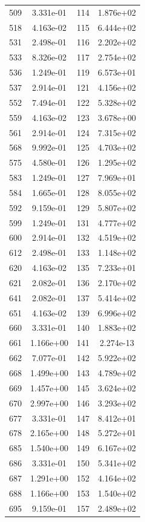 \documentclass[12pt]{article}
\begin{document}
\begin{longtable}{@{}cccc@{}}
509 & 3.331e-01 & 114 & 1.876e+02 \\
518 & 4.163e-02 & 115 & 6.444e+02 \\
531 & 2.498e-01 & 116 & 2.202e+02 \\
533 & 8.326e-02 & 117 & 2.754e+02 \\
536 & 1.249e-01 & 119 & 6.573e+01 \\
537 & 2.914e-01 & 121 & 4.156e+02 \\
552 & 7.494e-01 & 122 & 5.328e+02 \\
559 & 4.163e-02 & 123 & 3.678e+00 \\
561 & 2.914e-01 & 124 & 7.315e+02 \\
568 & 9.992e-01 & 125 & 4.703e+02 \\
575 & 4.580e-01 & 126 & 1.295e+02 \\
583 & 1.249e-01 & 127 & 7.969e+01 \\
584 & 1.665e-01 & 128 & 8.055e+02 \\
592 & 9.159e-01 & 129 & 5.807e+02 \\
599 & 1.249e-01 & 131 & 4.777e+02 \\
600 & 2.914e-01 & 132 & 4.519e+02 \\
612 & 2.498e-01 & 133 & 1.148e+02 \\
620 & 4.163e-02 & 135 & 7.233e+01 \\
621 & 2.082e-01 & 136 & 2.170e+02 \\
641 & 2.082e-01 & 137 & 5.414e+02 \\
651 & 4.163e-02 & 139 & 6.996e+02 \\
660 & 3.331e-01 & 140 & 1.883e+02 \\
661 & 1.166e+00 & 141 & 2.274e-13 \\
662 & 7.077e-01 & 142 & 5.922e+02 \\
668 & 1.499e+00 & 143 & 4.789e+02 \\
669 & 1.457e+00 & 145 & 3.624e+02 \\
670 & 2.997e+00 & 146 & 3.293e+02 \\
677 & 3.331e-01 & 147 & 8.412e+01 \\
678 & 2.165e+00 & 148 & 5.272e+01 \\
685 & 1.540e+00 & 149 & 6.167e+02 \\
686 & 3.331e-01 & 150 & 5.341e+02 \\
687 & 1.291e+00 & 152 & 4.164e+02 \\
688 & 1.166e+00 & 153 & 1.540e+02 \\
695 & 9.159e-01 & 157 & 2.489e+02 \\

\end{longtable}
\end{document}
